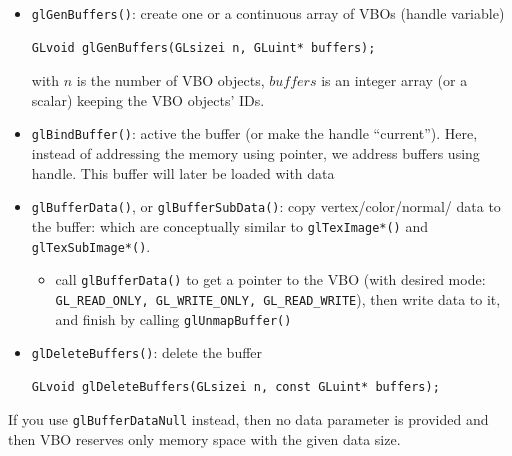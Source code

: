 \begin{itemize}
\item \verb!glGenBuffers()!: create one or a continuous array of VBOs
  (handle variable)
\begin{verbatim}
GLvoid glGenBuffers(GLsizei n, GLuint* buffers);
\end{verbatim}
  with $n$ is the number of VBO objects, $buffers$ is an integer array
  (or a scalar) keeping the VBO objects' IDs.  

\item \verb!glBindBuffer()!: active the buffer (or make the handle
  ``current''). Here, instead of addressing the memory using pointer,
  we address buffers using handle. This buffer will later be loaded
  with data

\item\verb!glBufferData()!, or \verb!glBufferSubData()!: copy
  vertex/color/normal/ data to the buffer: which are conceptually
  similar to \verb!glTexImage*()! and \verb!glTexSubImage*()!.
  \begin{itemize}
  \item call \verb!glBufferData()! to get a pointer to the VBO (with
    desired mode: \verb!GL_READ_ONLY, GL_WRITE_ONLY, GL_READ_WRITE!),
    then write data to it, and finish by calling
    \verb!glUnmapBuffer()!

  \end{itemize}

\item \verb!glDeleteBuffers()!: delete the buffer
\begin{verbatim}
GLvoid glDeleteBuffers(GLsizei n, const GLuint* buffers);
\end{verbatim}

\end{itemize}
If you use \verb!glBufferDataNull! instead, then no data parameter is
provided and then VBO reserves only memory space with the given data
size. 

